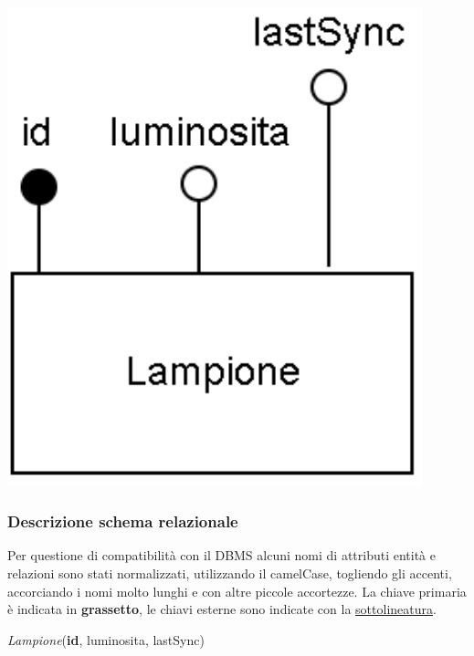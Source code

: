 \begin{center}
    \includegraphics[width=12cm]{contenuti/specifica-basi-dati/img-sbd/coordinazione_logico.png}
\end{center}

\subsubsection{Descrizione schema relazionale}

Per questione di compatibilità con il DBMS alcuni nomi di attributi entità e relazioni sono stati normalizzati, utilizzando il camelCase, togliendo gli accenti, accorciando i nomi molto lunghi e con altre piccole accortezze.
La chiave primaria è indicata in \textbf{grassetto}, le chiavi esterne sono indicate con la \underline{sottolineatura}.

\textit{Lampione}(\textbf{id}, luminosita, lastSync)